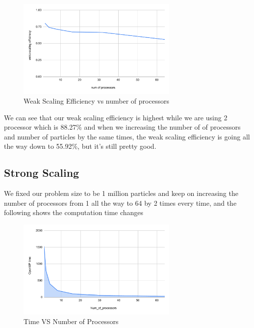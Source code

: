 \documentclass{article}
\begin{document}
\begin{figure}[H] %
\centering %
\includegraphics[width=0.7\textwidth]{figures/weka scaling efficinecy vs. num of processors.pdf} %
\caption{Weak Scaling Efficiency vs number of processors} %
\label{Weak Scaling Efficiency vs number of processors} %
\end{figure}

We can see that our weak scaling efficiency is highest while we are using 2 processor which is 88.27\% and when we increasing the number of of processors and number of particles by the same times, the weak scaling efficiency is going all the way down to 55.92\%, but it's still pretty good.

\subsection{Strong Scaling}

We fixed our problem size to be 1 million particles and keep on increasing the number of processors from 1 all the way to 64 by 2 times every time, and the following shows the computation time changes
\begin{figure}[H] %
\centering %
\includegraphics[width=0.7\textwidth]{figures/OpenMP time vs. Num_of_processors_strong.pdf} %
\caption{Time VS Number of Processors} %
\label{Time VS Number of Processors} %
\end{figure}
\end{document}
